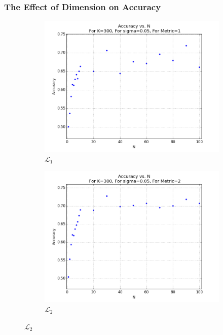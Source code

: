 \documentclass{article}
\begin{document}
\subsubsection{The Effect of Dimension on Accuracy}
\begin{figure}[H]
    \centering
    \begin{subfigure}[h]{.75\textwidth}
        \includegraphics[width=\textwidth]{l-experiment1-2-accuracy-n-k-300-s-005-l1.png}
    	\caption{$\mathcal{L}_1$}
    	\label{fig:exp1-2-accuracy-n-1}
    \end{subfigure}
    \begin{subfigure}[h]{.75\textwidth}
        \includegraphics[width=\textwidth]{l-experiment1-2-accuracy-n-k-300-s-005-l2.png}
    	\caption{$\mathcal{L}_2$}
    	\label{fig:exp1-2-accuracy-n-2}
    \end{subfigure}
\end{figure}
\end{document}

